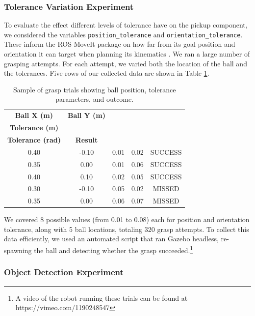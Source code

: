 \documentclass{article}
\begin{document}
\subsubsection{Tolerance Variation Experiment}
To evaluate the effect different levels of tolerance have on the pickup component, we considered the variables \texttt{position\_tolerance} and \texttt{orientation\_tolerance}. These inform the ROS MoveIt package on how far from its goal position and orientation it can target when planning its kinematics \cite{moveit_movegroupinterface}.
We ran a large number of grasping attempts. For each attempt, we varied both the location of the ball and the tolerances. Five rows of our collected data are shown in Table \ref{tab:sample_runs}.
\begin{table}[H]
    \centering
    \renewcommand{\arraystretch}{1.4}
    \begin{tabular}{ccccc}
        \toprule
        \textbf{Ball X (m)} & \textbf{Ball Y (m)} & \makecell{\textbf{Position} \\ \textbf{Tolerance (m)}} & \makecell{\textbf{Orientation} \\ \textbf{Tolerance (rad)}} & \textbf{Result} \\
        \midrule
        0.40 & -0.10 & 0.01 & 0.02 & SUCCESS \\
        0.35 &  0.00 & 0.01 & 0.06 & SUCCESS \\
        0.40 &  0.10 & 0.02 & 0.05 & SUCCESS \\
        0.30 & -0.10 & 0.05 & 0.02 & MISSED  \\
        0.35 &  0.00 & 0.06 & 0.07 & MISSED  \\
        \bottomrule
    \end{tabular}
    \caption{Sample of grasp trials showing ball position, tolerance parameters, and outcome.}
    \label{tab:sample_runs}
\end{table}
We covered 8 possible values (from 0.01 to 0.08) each for position and orientation tolerance, along with 5 ball locations, totaling 320 grasp attempts. To collect this data efficiently, we used an automated script that ran Gazebo headless, re-spawning the ball and detecting whether the grasp succeeded.\footnote{A video of the robot running these trials can be found at https://vimeo.com/1190248547} 

\subsubsection{Object Detection Experiment}
\end{document}
